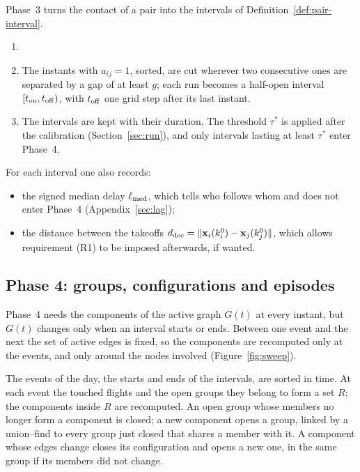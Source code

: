 Phase~3 turns the contact of a pair into the intervals of Definition~\ref{def:pair-interval}.
\begin{enumerate}
  \item {}
  \item The instants with $a_{ij}=1$, sorted, are cut wherever two consecutive ones are separated
        by a gap of at least $g$; each run becomes a half-open interval $[t_{\rm on},t_{\rm off})$,
        with $t_{\rm off}$ one grid step after its last instant.
  \item The intervals are kept with their duration. The threshold $\tau^*$ is applied after the
        calibration (Section~\ref{sec:run}), and only intervals lasting at least $\tau^*$ enter
        Phase~4.
\end{enumerate}
For each interval one also records:
\begin{itemize}
  \item the signed median delay $\ell_{\rm med}$, which tells who follows whom and does not enter
        Phase~4 (Appendix~\ref{sec:lag});
  \item the distance between the takeoffs $d_{\rm dec}=\|\mathbf{x}_i(k^0_i)-\mathbf{x}_j(k^0_j)\|$, which allows
        requirement (R1) to be imposed afterwards, if wanted.
\end{itemize}

\subsection{Phase 4: groups, configurations and episodes}\label{sec:phase4}

Phase~4 needs the components of the active graph $G(t)$ at every instant, but $G(t)$ changes only
when an interval starts or ends. Between one event and the next the set of active edges is
fixed, so the components are recomputed only at the events, and only around the nodes involved
(Figure~\ref{fig:sweep}).

\begin{inwords}
The events of the day, the starts and ends of the intervals, are sorted in time. At each event
the touched flights and the open groups they belong to form a set $R$; the components inside
$R$ are recomputed. An open group whose members no longer form a component is closed; a new
component opens a group, linked by a union--find to every group just closed that shares a member
with it. A component whose edges change closes its configuration and opens a new one, in the same
group if its members did not change.
\end{inwords}

